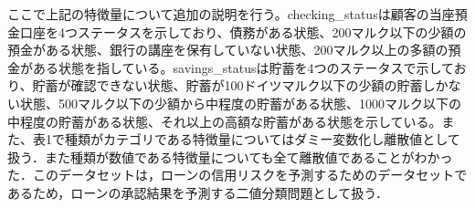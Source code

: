 ここで上記の特徴量について追加の説明を行う。checking\_statusは顧客の当座預金口座を4つステータスを示しており、債務がある状態、200マルク以下の少額の預金がある状態、銀行の講座を保有していない状態、200マルク以上の多額の預金がある状態を指している。savings\_statusは貯蓄を4つのステータスで示しており、貯蓄が確認できない状態、貯蓄が100ドイツマルク以下の少額の貯蓄しかない状態、500マルク以下の少額から中程度の貯蓄がある状態、1000マルク以下の中程度の貯蓄がある状態、それ以上の高額な貯蓄がある状態を示している。また、表1で種類がカテゴリである特徴量についてはダミー変数化し離散値として扱う．また種類が数値である特徴量についても全て離散値であることがわかった．このデータセットは，ローンの信用リスクを予測するためのデータセットであるため，ローンの承認結果を予測する二値分類問題として扱う．